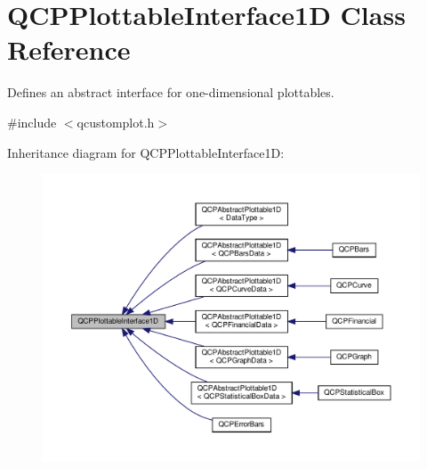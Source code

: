 \hypertarget{classQCPPlottableInterface1D}{}\section{Q\+C\+P\+Plottable\+Interface1D Class Reference}
\label{classQCPPlottableInterface1D}


Defines an abstract interface for one-\/dimensional plottables.  




{\ttfamily \#include $<$qcustomplot.\+h$>$}



Inheritance diagram for Q\+C\+P\+Plottable\+Interface1D\+:\nopagebreak
\begin{figure}[H]
\begin{center}
\leavevmode
\includegraphics[width=350pt]{classQCPPlottableInterface1D__inherit__graph}
\end{center}
\end{figure}
